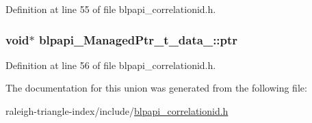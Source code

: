 Definition at line 55 of file blpapi\+\_\+correlationid.\+h.

\subsubsection[{\texorpdfstring{ptr}{ptr}}]{\setlength{\rightskip}{0pt plus 5cm}void$\ast$ blpapi\+\_\+\+Managed\+Ptr\+\_\+t\+\_\+data\+\_\+\+::ptr}\hypertarget{unionblpapi___managed_ptr__t__data___a397e20f80527b2fa6b6f6389148df400}{}\label{unionblpapi___managed_ptr__t__data___a397e20f80527b2fa6b6f6389148df400}


Definition at line 56 of file blpapi\+\_\+correlationid.\+h.



The documentation for this union was generated from the following file\+:\begin{DoxyCompactItemize}
\item 
raleigh-\/triangle-\/index/include/\hyperlink{blpapi__correlationid_8h}{blpapi\+\_\+correlationid.\+h}\end{DoxyCompactItemize}
